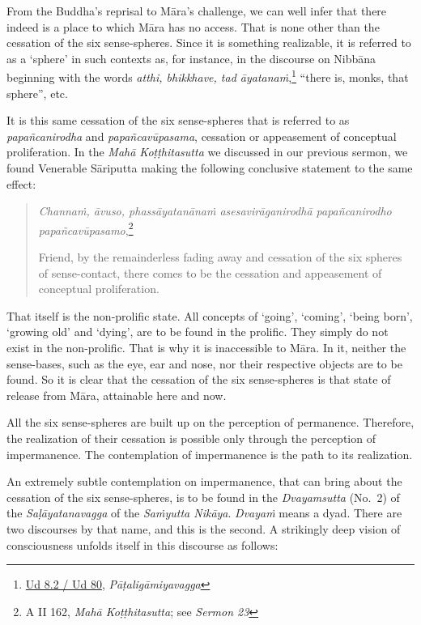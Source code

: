 From the Buddha's reprisal to Māra's challenge, we can well infer that there indeed is a place to which Māra has no access. That is none other than the cessation of the six sense-spheres. Since it is something realizable, it is referred to as a `sphere' in such contexts as, for instance, in the discourse on Nibbāna beginning with the words \emph{atthi, bhikkhave, tad āyatanaṁ},\footnote{\href{https://suttacentral.net/ud8.2/pli/ms}{Ud 8.2 / Ud 80}, \emph{Pāṭaligāmiyavagga}} ``there is, monks, that sphere'', etc.

It is this same cessation of the six sense-spheres that is referred to as \emph{papañcanirodha} and \emph{papañcavūpasama}, cessation or appeasement of conceptual proliferation. In the \emph{Mahā Koṭṭhitasutta} we discussed in our previous sermon, we found Venerable Sāriputta making the following conclusive statement to the same effect:

\begin{quote}
\emph{Channaṁ, āvuso, phassāyatanānaṁ asesavirāganirodhā papañcanirodho papañcavūpasamo},\footnote{A II 162, \emph{Mahā Koṭṭhitasutta}; see \emph{Sermon 23}}

Friend, by the remainderless fading away and cessation of the six spheres of sense-contact, there comes to be the cessation and appeasement of conceptual proliferation.
\end{quote}

That itself is the non-prolific state. All concepts of `going', `coming', `being born', `growing old' and `dying', are to be found in the prolific. They simply do not exist in the non-prolific. That is why it is inaccessible to Māra. In it, neither the sense-bases, such as the eye, ear and nose, nor their respective objects are to be found. So it is clear that the cessation of the six sense-spheres is that state of release from Māra, attainable here and now.

All the six sense-spheres are built up on the perception of permanence. Therefore, the realization of their cessation is possible only through the perception of impermanence. The contemplation of impermanence is the path to its realization.

An extremely subtle contemplation on impermanence, that can bring about the cessation of the six sense-spheres, is to be found in the \emph{Dvayamsutta} (No.~2) of the \emph{Saḷāyatanavagga} of the \emph{Saṁyutta Nikāya}. \emph{Dvayaṁ} means a dyad. There are two discourses by that name, and this is the second. A strikingly deep vision of consciousness unfolds itself in this discourse as follows:

